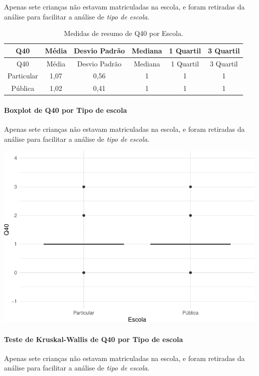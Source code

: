 \documentclass[]{article}
\let\oldparagraph\paragraph
\renewcommand{\paragraph}[1]{\oldparagraph{#1}\mbox{}}
\begin{document}
Apenas sete crianças não estavam matriculadas na escola, e foram retiradas da análise para facilitar a análise de \emph{tipo de escola}.

\begin{longtable}[]{@{}cccccc@{}}
\caption{\label{tab:unnamed-chunk-1591}Medidas de resumo de Q40 por Escola.}\tabularnewline
\toprule
Q40 & Média & Desvio Padrão & Mediana & 1 Quartil & 3 Quartil\tabularnewline
\midrule
\endfirsthead
\toprule
Q40 & Média & Desvio Padrão & Mediana & 1 Quartil & 3 Quartil\tabularnewline
\midrule
\endhead
Particular & 1,07 & 0,56 & 1 & 1 & 1\tabularnewline
Pública & 1,02 & 0,41 & 1 & 1 & 1\tabularnewline
\bottomrule
\end{longtable}

\hypertarget{boxplot-de-q40-por-tipo-de-escola}{%
\paragraph{Boxplot de Q40 por Tipo de escola}\label{boxplot-de-q40-por-tipo-de-escola}}

Apenas sete crianças não estavam matriculadas na escola, e foram retiradas da análise para facilitar a análise de \emph{tipo de escola}.

\begin{center}\includegraphics[width=0.75\linewidth]{relatorio_covid19_files/figure-latex/unnamed-chunk-1592-1} \end{center}

\hypertarget{teste-de-kruskal-wallis-de-q40-por-tipo-de-escola}{%
\paragraph{Teste de Kruskal-Wallis de Q40 por Tipo de escola}\label{teste-de-kruskal-wallis-de-q40-por-tipo-de-escola}}

Apenas sete crianças não estavam matriculadas na escola, e foram retiradas da análise para facilitar a análise de \emph{tipo de escola}.
\end{document}
